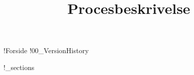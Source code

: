 \documentclass[a4paper,openany]{memoir}
\title{Procesbeskrivelse}
\begin{document}
	{!Forside}  \newpage
	\tableofcontents\thispagestyle{fancy}
	{!00_VersionHistory}  \newpage

	{!_sections}  \newpage

	 {}
	\printbibliography
\end{document}
